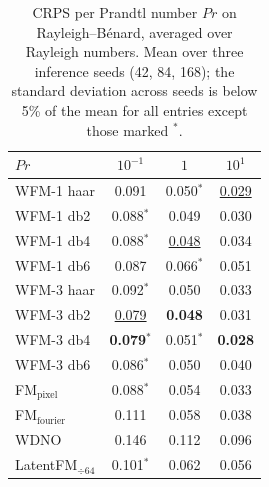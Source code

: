 \begin{table}[ht]
\centering
\caption{CRPS per Prandtl number $Pr$ on Rayleigh--B\'enard, averaged over Rayleigh numbers. Mean over three inference seeds (42, 84, 168); the standard deviation across seeds is below 5\% of the mean for all entries except those marked $^{*}$.}
\label{tab:ablation_rb_crps_pr}
\begin{tabular}{lccc}
\toprule
$Pr$ & $10^{-1}$ & $1$ & $10^{1}$ \\
\midrule
WFM-1 haar & 0.091 & 0.050$^{*}$ & \underline{0.029} \\
WFM-1 db2 & 0.088$^{*}$ & 0.049 & 0.030 \\
WFM-1 db4 & 0.088$^{*}$ & \underline{0.048} & 0.034 \\
WFM-1 db6 & 0.087 & 0.066$^{*}$ & 0.051 \\
\midrule
WFM-3 haar & 0.092$^{*}$ & 0.050 & 0.033 \\
WFM-3 db2 & \underline{0.079} & \textbf{0.048} & 0.031 \\
WFM-3 db4 & \textbf{0.079}$^{*}$ & 0.051$^{*}$ & \textbf{0.028} \\
WFM-3 db6 & 0.086$^{*}$ & 0.050 & 0.040 \\
\midrule
FM$_\text{pixel}$ & 0.088$^{*}$ & 0.054 & 0.033 \\
FM$_\text{fourier}$ & 0.111 & 0.058 & 0.038 \\
WDNO & 0.146 & 0.112 & 0.096 \\
LatentFM$_{\div 64}$ & 0.101$^{*}$ & 0.062 & 0.056 \\
\bottomrule
\end{tabular}
\end{table}
